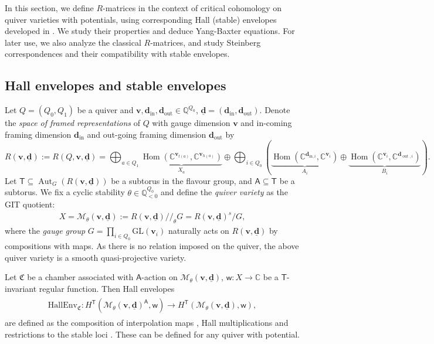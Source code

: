 \documentclass[10pt]{amsart}
\theoremstyle{definition}
\numberwithin{equation}{section}
\newcommand{\HallEnv}{\mathrm{HallEnv}}
\newcommand{\C}{\mathbb{C}}
\newcommand{\GL}{\mathrm{GL}}
\newcommand{\bC}{\mathbb{C}}
\newcommand{\bQ}{\mathbb{Q}}
\newcommand{\bv}{\mathbf{v}}
\newcommand{\bd}{\mathbf{d}}
\newcommand{\cM}{\mathcal{M}}
\newcommand{\fC}{\mathfrak{C}}
\newcommand{\sA}{\mathsf{A}}
\newcommand{\sT}{\mathsf{T}}
\newcommand{\sw}{\mathsf{w}}
\newcommand{\Aut}{\operatorname{Aut}}
\newcommand{\Hom}{\operatorname{Hom}}
\newcommand{\In}{\operatorname{in}}
\newcommand{\Out}{\operatorname{out}}
\begin{document}
In this section, we define $R$-matrices in the context of critical cohomology on quiver varieties with potentials, using corresponding 
Hall (stable) envelopes developed in \cite[\S 9]{COZZ}. We study their properties and deduce Yang-Baxter equations. For later use, we also analyze the classical $R$-matrices, and study Steinberg correspondences and their compatibility with stable envelopes. 


\subsection{Hall envelopes and stable envelopes}
Let $Q=(Q_0,Q_1)$ be a quiver and $\bv,\bd_{\In},\bd_{\Out}\in \bQ^{Q_0}$, $\underline{\bd}=(\bd_{\In},\bd_{\Out})$. Denote the \textit{space of framed representations} of $Q$ with gauge dimension $\mathbf{v}$ and in-coming framing dimension $\mathbf{d}_{\mathrm{in}}$ 
and out-going framing dimension $\mathbf d_{\mathrm{out}}$ by 
\begin{equation}\label{equ rvab}
R(\mathbf{v},\underline{\bd}):=R(Q,\mathbf{v},\underline{\bd})=\bigoplus_{a\in Q_1}\underbrace{\Hom(\bC^{\mathbf v_{t(a)}},\bC^{\mathbf v_{h(a)}})}_{X_a}\oplus \bigoplus_{i\in Q_0}\left(\underbrace{\Hom(\bC^{\bd_{\mathrm{in},i}},\bC^{\mathbf v_i})}_{A_i}\oplus \underbrace{\Hom(\bC^{\mathbf v_i},\bC^{\bd_{\Out,i}})}_{B_i}\right).
\end{equation}
Let $\sT\subseteq \Aut_G(R(\bv,\underline{\bd}))$ be a subtorus in the flavour group, and $\sA\subseteq \sT$ be a subtorus. We fix a cyclic stability $\theta\in \bQ_{<0}^{Q_0}$ and define the \textit{quiver variety} as the GIT quotient:
\begin{align}\label{equ on qv}
    X=\cM_\theta(\bv,\underline{\bd}):=R(\mathbf{v},\underline{\bd})/\!\!/_{\theta} G=R(\mathbf{v},\underline{\bd})^s/G,
\end{align}
where the \textit{gauge group} $G=\prod_{i\in Q_0}\GL(\mathbf v_i)$ naturally acts on $R(\mathbf{v},\underline{\bd})$ by compositions with maps. 
As there is no relation imposed on the quiver, the above quiver variety is a smooth quasi-projective variety. 

Let $\fC$ be a chamber associated with $\sA$-action on $\cM_\theta(\bv,\underline{\bd})$, $\sw\colon X\to \C$ be a $\sT$-invariant regular function.
Then Hall envelopes 
\begin{align}\label{equ on hall env}
\begin{gathered}
\HallEnv_\fC\colon H^\sT(\cM_\theta(\bv,\underline{\bd})^{\sA},\sw)\longrightarrow H^\sT(\cM_\theta(\bv,\underline{\bd}),\sw),
\end{gathered}
\end{align}
are defined as the composition of interpolation maps \cite[Def.~9.1]{COZZ}, Hall multiplications and restrictions to the stable loci \cite[Def.~9.4]{COZZ}. These can be defined for any quiver with potential. 
\end{document}
